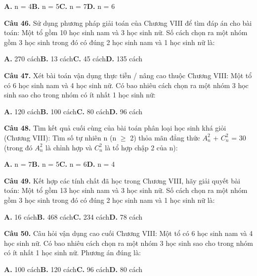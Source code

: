 \documentclass[11pt,a4paper]{article}
\begin{document}
\hspace*{1.5em}\textbf{A.} n = 4\quad\quad \textbf{B.} n = 5\quad\quad \textbf{C.} n = 7\quad\quad \textbf{D.} n = 6\par\vspace{2pt}
\textbf{\color{primary} Câu 46.} Sử dụng phương pháp giải toán của Chương VIII để tìm đáp án cho bài toán: Một tổ gồm 10 học sinh nam và 3 học sinh nữ. Số cách chọn ra một nhóm gồm 3 học sinh trong đó có đúng 2 học sinh nam và 1 học sinh nữ là:\par
\hspace*{1.5em}\textbf{A.} 270 cách\quad\quad \textbf{B.} 13 cách\quad\quad \textbf{C.} 45 cách\quad\quad \textbf{D.} 135 cách\par\vspace{2pt}
\textbf{\color{primary} Câu 47.} Xét bài toán vận dụng thực tiễn / nâng cao thuộc Chương VIII: Một tổ có 6 học sinh nam và 4 học sinh nữ. Có bao nhiêu cách chọn ra một nhóm 3 học sinh sao cho trong nhóm có ít nhất 1 học sinh nữ:\par
\hspace*{1.5em}\textbf{A.} 120 cách\quad\quad \textbf{B.} 100 cách\quad\quad \textbf{C.} 80 cách\quad\quad \textbf{D.} 96 cách\par\vspace{2pt}
\textbf{\color{primary} Câu 48.} Tìm kết quả cuối cùng của bài toán phân loại học sinh khá giỏi (Chương VIII): Tìm số tự nhiên n (n $\ge$ 2) thỏa mãn đẳng thức $A_n^2$ + $C_n^2$ = 30 (trong đó $A_n^2$ là chỉnh hợp và $C_n^2$ là tổ hợp chập 2 của n):\par
\hspace*{1.5em}\textbf{A.} n = 7\quad\quad \textbf{B.} n = 5\quad\quad \textbf{C.} n = 6\quad\quad \textbf{D.} n = 4\par\vspace{2pt}
\textbf{\color{primary} Câu 49.} Kết hợp các tính chất đã học trong Chương VIII, hãy giải quyết bài toán: Một tổ gồm 13 học sinh nam và 3 học sinh nữ. Số cách chọn ra một nhóm gồm 3 học sinh trong đó có đúng 2 học sinh nam và 1 học sinh nữ là:\par
\hspace*{1.5em}\textbf{A.} 16 cách\quad\quad \textbf{B.} 468 cách\quad\quad \textbf{C.} 234 cách\quad\quad \textbf{D.} 78 cách\par\vspace{2pt}
\textbf{\color{primary} Câu 50.} Câu hỏi vận dụng cao cuối Chương VIII: Một tổ có 6 học sinh nam và 4 học sinh nữ. Có bao nhiêu cách chọn ra một nhóm 3 học sinh sao cho trong nhóm có ít nhất 1 học sinh nữ. Phương án đúng là:\par
\hspace*{1.5em}\textbf{A.} 100 cách\quad\quad \textbf{B.} 120 cách\quad\quad \textbf{C.} 96 cách\quad\quad \textbf{D.} 80 cách\par\vspace{2pt}
\end{document}
